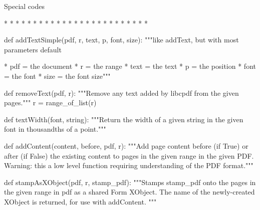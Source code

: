     Special codes

      * %
      * %
      * %
      * %
      * %
      * %
      * %
      * %
      * %
      * %
      * %
      * %
      * %
      * %
      * %
      * %
      * %
      * %
      * %
      * %
      * %
      * %
      * %
      * %
      * %

def addTextSimple(pdf, r, text, p, font, size):
    """like addText, but with most parameters default

         * pdf = the document
         * r = the range
         * text = the text
         * p = the position
         * font = the font
         * size = the font size"""

def removeText(pdf, r):
    """Remove any text added by libcpdf from the given pages."""
    r = range_of_list(r)

def textWidth(font, string):
    """Return the width of a given string in the given font in thousandths of a
    point."""

def addContent(content, before, pdf, r):
    """Add page content before (if True) or after (if False) the existing
    content to pages in the given range in the given PDF. Warning: this a low
    level function requiring understanding of the PDF format."""

def stampAsXObject(pdf, r, stamp_pdf):
    """Stamps stamp_pdf onto the pages in the given range in pdf as a shared
    Form XObject. The name of the newly-created XObject is returned, for use
    with addContent. """
